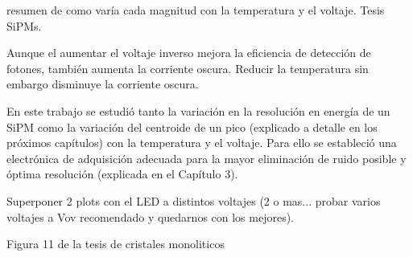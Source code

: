 resumen de como varía cada magnitud con la temperatura y el voltaje. Tesis SiPMs.

Aunque el aumentar el voltaje inverso mejora la eficiencia de detección de fotones, también aumenta la corriente oscura. Reducir la temperatura sin embargo disminuye la corriente oscura.

En este trabajo se estudió tanto la variación en la resolución en energía de un SiPM como la variación del centroide de un pico (explicado a detalle en los próximos capítulos) con la temperatura y el voltaje. Para ello se estableció una electrónica de adquisición adecuada para la mayor eliminación de ruido posible y óptima resolución (explicada en el Capítulo 3).


Superponer 2 plots con el LED a distintos voltajes (2 o mas... probar varios voltajes a Vov recomendado y quedarnos con los mejores).

Figura 11 de la tesis de cristales monoliticos

